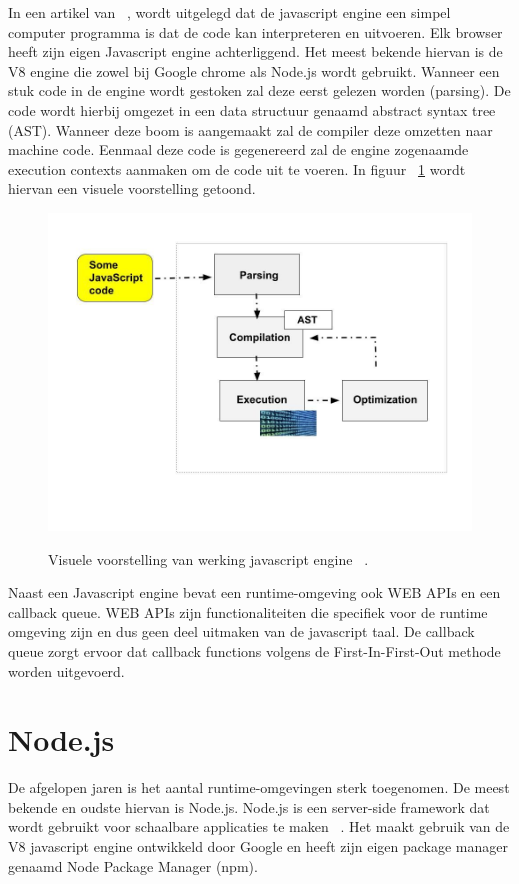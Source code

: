 In een artikel van ~\textcite{Christopher}, 
wordt uitgelegd dat de javascript engine een simpel computer programma is dat de code kan interpreteren en uitvoeren.
Elk browser heeft zijn eigen Javascript engine achterliggend. Het meest bekende hiervan is de
V8 engine die zowel bij Google chrome als Node.js wordt gebruikt. 
Wanneer een stuk code in de engine wordt gestoken zal deze eerst gelezen worden (parsing). 
De code wordt hierbij omgezet in een data structuur genaamd abstract syntax tree (AST).
Wanneer deze boom is aangemaakt zal de compiler deze omzetten naar machine code. 
Eenmaal deze code is gegenereerd zal de engine zogenaamde execution contexts aanmaken om de code uit te voeren.
In figuur ~\ref{fig:javascriptengine} wordt hiervan een visuele voorstelling getoond.
\begin{figure}[H]
    \centering
    \includegraphics[width=.9\textwidth]{graphics/javascriptengine.jpeg}
    \caption{\label{fig:javascriptengine}}Visuele voorstelling van werking javascript engine ~\autocite{Christopher}.
\end{figure}

Naast een Javascript engine bevat een runtime-omgeving ook WEB APIs en een callback queue. 
WEB APIs zijn functionaliteiten die specifiek voor de runtime omgeving zijn en dus geen deel uitmaken van de javascript taal.
De callback queue zorgt ervoor dat callback functions volgens de First-In-First-Out methode worden uitgevoerd.

\section{Node.js}
De afgelopen jaren is het aantal runtime-omgevingen sterk toegenomen. De meest bekende en oudste hiervan is Node.js.
Node.js is een server-side framework dat wordt gebruikt voor schaalbare applicaties te maken ~\autocite{Gackenheimer2013}.
Het maakt gebruik van de V8 javascript engine ontwikkeld door Google en heeft zijn eigen package manager genaamd Node Package Manager (npm).

